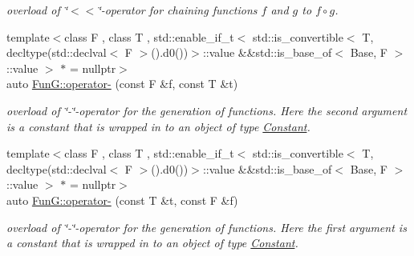 \begin{DoxyCompactItemize}
\begin{DoxyCompactList}\small\item\em overload of \char`\"{}$<$$<$\char`\"{}-\/operator for chaining functions $f$ and $g$ to $ f \circ g $. \end{DoxyCompactList}\item 
{\footnotesize template$<$class F , class T , std\+::enable\+\_\+if\+\_\+t$<$ std\+::is\+\_\+convertible$<$ T, decltype(std\+::declval$<$ F $>$().\+d0())$>$\+::value \&\&std\+::is\+\_\+base\+\_\+of$<$ Base, F $>$\+::value $>$ $\ast$  = nullptr$>$ }\\auto \hyperlink{namespaceFunG_aa0c4552dee9179fb50b57ece863d835a}{Fun\+G\+::operator-\/} (const F \&f, const T \&t)
\begin{DoxyCompactList}\small\item\em overload of \char`\"{}-\/\char`\"{}-\/operator for the generation of functions. Here the second argument is a constant that is wrapped in to an object of type \hyperlink{structFunG_1_1Constant}{Constant}. \end{DoxyCompactList}\item 
{\footnotesize template$<$class F , class T , std\+::enable\+\_\+if\+\_\+t$<$ std\+::is\+\_\+convertible$<$ T, decltype(std\+::declval$<$ F $>$().\+d0())$>$\+::value \&\&std\+::is\+\_\+base\+\_\+of$<$ Base, F $>$\+::value $>$ $\ast$  = nullptr$>$ }\\auto \hyperlink{namespaceFunG_a7f522d98a8d5bc8c3b11599d3136ded4}{Fun\+G\+::operator-\/} (const T \&t, const F \&f)
\begin{DoxyCompactList}\small\item\em overload of \char`\"{}-\/\char`\"{}-\/operator for the generation of functions. Here the first argument is a constant that is wrapped in to an object of type \hyperlink{structFunG_1_1Constant}{Constant}. \end{DoxyCompactList}\end{DoxyCompactItemize}
